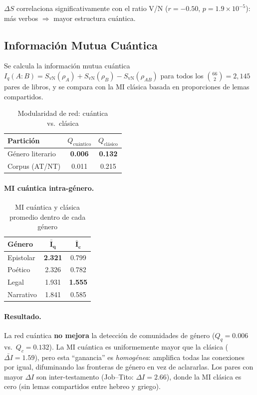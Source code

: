 \documentclass[12pt,a4paper]{article}
\newcommand{\val}[1]{\textcolor{hlcolor}{\textbf{#1}}}
\begin{document}
$\Delta S$ correlaciona significativamente con el ratio V/N ($r = -0.50$, $p = 1.9 \times 10^{-5}$):
m\'as verbos $\Rightarrow$ mayor estructura cu\'antica.

\subsection{Informaci\'on Mutua Cu\'antica}

Se calcula la informaci\'on mutua cu\'antica $I_q(A:B) = S_{\text{vN}}(\rho_A) + S_{\text{vN}}(\rho_B) - S_{\text{vN}}(\rho_{AB})$
para todos los $\binom{66}{2} = 2{,}145$ pares de libros, y se compara con la
MI cl\'asica basada en proporciones de lemas compartidos.

\begin{table}[H]
\centering
\caption{Modularidad de red: cu\'antica vs.\ cl\'asica}
\label{tab:modularity}
\begin{tabular}{lcc}
\toprule
\textbf{Partici\'on} & \textbf{$Q_{\text{cu\'antico}}$} & \textbf{$Q_{\text{cl\'asico}}$} \\
\midrule
G\'enero literario & \val{0.006} & \val{0.132} \\
Corpus (AT/NT)      & 0.011 & 0.215 \\
\bottomrule
\end{tabular}
\end{table}

\paragraph{MI cu\'antica intra-g\'enero.}
\begin{table}[H]
\centering
\caption{MI cu\'antica y cl\'asica promedio dentro de cada g\'enero}
\label{tab:qmigenre}
\begin{tabular}{lcc}
\toprule
\textbf{G\'enero} & $\boldsymbol{\bar{I}_q}$ & $\boldsymbol{\bar{I}_c}$ \\
\midrule
Epistolar  & \val{2.321} & 0.799 \\
Po\'etico  & 2.326 & 0.782 \\
Legal      & 1.931 & \val{1.555} \\
Narrativo  & 1.841 & 0.585 \\
\bottomrule
\end{tabular}
\end{table}

\paragraph{Resultado.}
La red cu\'antica \textbf{no mejora} la detecci\'on de comunidades de g\'enero
($Q_q = 0.006$ vs.\ $Q_c = 0.132$). La MI cu\'antica es uniformemente mayor que la
cl\'asica ($\bar{\Delta I} = 1.59$), pero esta ``ganancia'' es \emph{homog\'enea}:
amplifica todas las conexiones por igual, difuminando las fronteras de g\'enero en vez
de aclararlas. Los pares con mayor $\Delta I$ son inter-testamento (Job--Tito: $\Delta I = 2.66$),
donde la MI cl\'asica es cero (sin lemas compartidos entre hebreo y griego).
\end{document}
